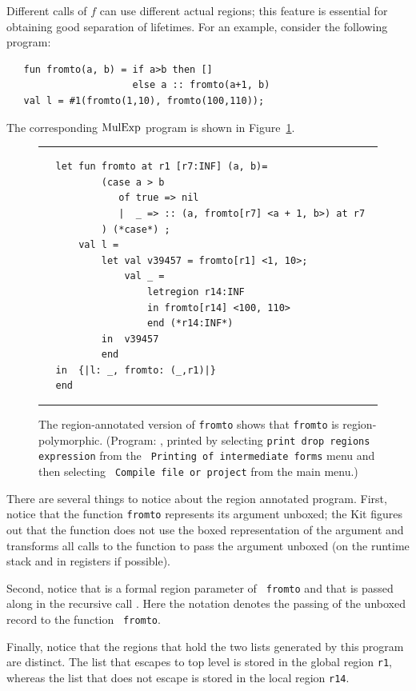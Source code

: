 \documentclass[12pt]{book}
\begin{document}
Different calls of $f$ can use different actual regions; this feature
is essential for obtaining good separation of lifetimes.  For an
example, consider the following program:
\begin{verbatim}
   fun fromto(a, b) = if a>b then []
                      else a :: fromto(a+1, b)
   val l = #1(fromto(1,10), fromto(100,110));
\end{verbatim}
The corresponding $\hbox{\rm MulExp}$ program is shown in
Figure~\ref{fromto.fig}.
\begin{figure}
\hrule
\medskip
\begin{verbatim}
   let fun fromto at r1 [r7:INF] (a, b)= 
           (case a > b 
              of true => nil
              |  _ => :: (a, fromto[r7] <a + 1, b>) at r7
           ) (*case*) ; 
       val l = 
           let val v39457 = fromto[r1] <1, 10>; 
               val _ = 
                   letregion r14:INF 
                   in fromto[r14] <100, 110> 
                   end (*r14:INF*)
           in  v39457
           end 
   in  {|l: _, fromto: (_,r1)|}
   end 
\end{verbatim}
\caption{The region-annotated version of {\tt fromto} shows that {\tt fromto}
  is region-polymorphic. (Program: , printed
  by selecting {\tt print drop regions expression} from the {\tt
    Printing of intermediate forms} menu and then selecting {\tt
    Compile file or project} from the main menu.)}  \medskip

\hrule
\label{fromto.fig}
\end{figure}

There are several things to notice about the region annotated program.
First, notice that the function {\tt fromto} represents its argument
%
%
unboxed; the Kit figures out that the function does not
use the boxed representation of the argument and transforms all calls
to the function to pass the argument unboxed (on the runtime stack and
in registers if possible).

Second, notice that  is a formal region parameter of {\tt
  fromto} and that  is passed along in the recursive call
. Here the notation 
denotes the passing of the unboxed record to the function {\tt
  fromto}.

%
Finally, notice that the regions that hold the two lists generated by
this program are distinct.  The list that escapes to top level is
stored in the global region {\tt r1}, whereas the list that does not
escape is stored in the local region {\tt r14}.
\end{document}
